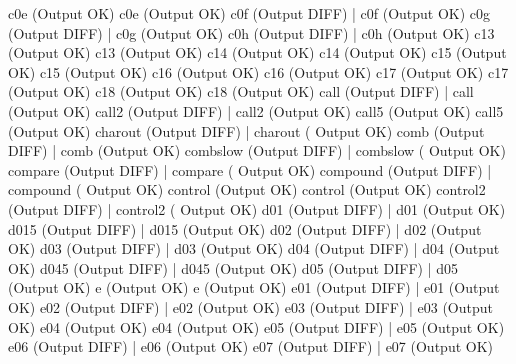 \documentclass[12pt]{book}
\begin{document}
c0e (Output OK)                                        c0e (Output OK)
c0f (Output DIFF)                                      |    c0f (Output OK)
c0g (Output DIFF)                                      |    c0g (Output OK)
c0h (Output DIFF)                                      |    c0h (Output OK)
c13 (Output OK)                                        c13 (Output OK)
c14 (Output OK)                                        c14 (Output OK)
c15 (Output OK)                                        c15 (Output OK)
c16 (Output OK)                                        c16 (Output OK)
c17 (Output OK)                                        c17 (Output OK)
c18 (Output OK)                                        c18 (Output OK)
call (Output DIFF)                                      |    call (Output OK)
call2 (Output DIFF)                                      |    call2 (Output 
OK)
call5 (Output OK)                                    call5 (Output OK)
charout (Output DIFF)                                      |    charout (
Output OK)
comb (Output DIFF)                                      |    comb (Output OK)
combslow (Output DIFF)                                      |    combslow (
Output OK)
compare (Output DIFF)                                      |    compare (
Output OK)
compound (Output DIFF)                                      |    compound (
Output OK)
control (Output OK)                                    control (Output OK)
control2 (Output DIFF)                                      |    control2 (
Output OK)
d01 (Output DIFF)                                      |    d01 (Output OK)
d015 (Output DIFF)                                      |    d015 (Output OK)
d02 (Output DIFF)                                      |    d02 (Output OK)
d03 (Output DIFF)                                      |    d03 (Output OK)
d04 (Output DIFF)                                      |    d04 (Output OK)
d045 (Output DIFF)                                      |    d045 (Output OK)
d05 (Output DIFF)                                      |    d05 (Output OK)
e (Output OK)                                        e (Output OK)
e01 (Output DIFF)                                      |    e01 (Output OK)
e02 (Output DIFF)                                      |    e02 (Output OK)
e03 (Output DIFF)                                      |    e03 (Output OK)
e04 (Output OK)                                        e04 (Output OK)
e05 (Output DIFF)                                      |    e05 (Output OK)
e06 (Output DIFF)                                      |    e06 (Output OK)
e07 (Output DIFF)                                      |    e07 (Output OK)
\end{document}

